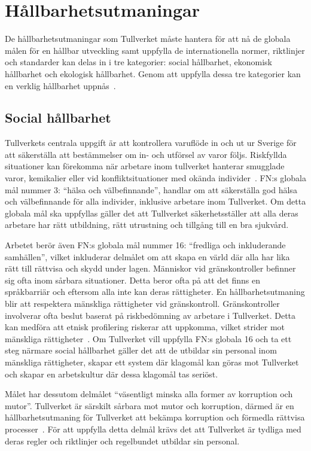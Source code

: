 \section{Hållbarhetsutmaningar}

De hållbarhetsutmaningar som Tullverket måste hantera för att nå de globala
målen för en hållbar utveckling samt uppfylla de internationella normer,
riktlinjer och standarder kan delas in i tre kategorier: social hållbarhet,
ekonomisk hållbarhet och ekologisk hållbarhet. Genom att uppfylla dessa tre
kategorier kan en verklig hållbarhet uppnås~\cite{hallbar}.

\subsection{Social hållbarhet} \label{social}

Tullverkets centrala uppgift är att kontrollera varuflöde in och ut ur Sverige
för att säkerställa att bestämmelser om in- och utförsel av varor följs.
Riskfyllda situationer kan förekomma när arbetare inom tullverket hanterar
smugglade varor, kemikalier eller vid konfliktsituationer med okända
individer~\cite{vapen}. FN:s globala mål nummer 3: ``hälsa och välbefinnande'',
handlar om att säkerställa god hälsa och välbefinnande för alla individer,
inklusive arbetare inom Tullverket. Om detta globala mål ska uppfyllas gäller
det att Tullverket säkerhetsställer att alla deras arbetare har rätt
utbildning, rätt utrustning och tillgång till en bra sjukvård.

Arbetet berör även FN:s globala mål nummer 16: ``fredliga och inkluderande
samhällen'', vilket inkluderar delmålet om att skapa en värld där alla har lika
rätt till rättvisa och skydd under lagen. Människor vid gränskontroller
befinner sig ofta inom sårbara situationer. Detta beror ofta på att det finns
en språkbarriär och eftersom alla inte kan deras rättigheter. En
hållbarhetsutmaning blir att respektera mänskliga rättigheter vid
gränskontroll. Gränskontroller involverar ofta beslut baserat på riskbedömning
av arbetare i Tullverket. Detta kan medföra att etnisk profilering riskerar att
uppkomma, vilket strider mot mänskliga rättigheter~\cite{etik}. Om Tullverket 
vill uppfylla FN:s globala 16 och ta ett steg närmare social hållbarhet gäller
det att de utbildar sin personal inom mänskliga rättigheter, skapar ett system
där klagomål kan göras mot Tullverket och skapar en arbetskultur där dessa
klagomål tas seriöst.

Målet har dessutom delmålet ``väsentligt minska alla former av korruption och
mutor''. Tullverket är särskilt sårbara mot mutor och korruption, därmed är en
hållbarhetsutmaning för Tullverket att bekämpa korruption och förmedla rättvisa
processer~\cite{granskning2008}. För att uppfylla detta delmål krävs det att
Tullverket är tydliga med deras regler och riktlinjer och regelbundet utbildar
sin personal.

